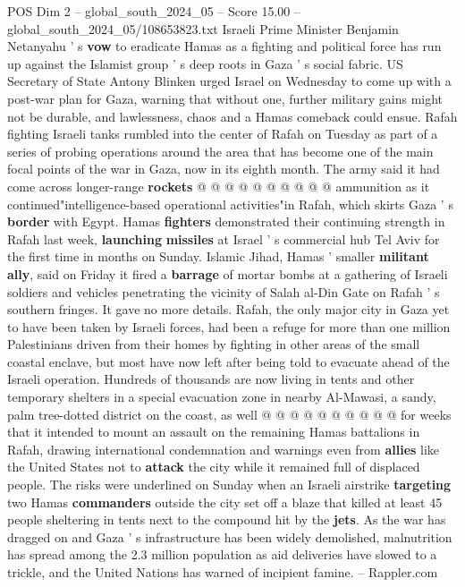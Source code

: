 \begin{textsample}{POS Dim 2 – global\_south\_2024\_05 – Score 15.00 – global\_south\_2024\_05/108653823.txt}
Israeli Prime Minister Benjamin Netanyahu ' s \textbf{vow} to eradicate Hamas as a fighting and political force has run up against the Islamist group ' s deep roots in Gaza ' s social fabric.
US Secretary of State Antony Blinken urged Israel on Wednesday to come up with a post-war plan for Gaza, warning that without one, further military gains might not be durable, and lawlessness, chaos and a Hamas comeback could ensue.
Rafah fighting Israeli tanks rumbled into the center of Rafah on Tuesday as part of a series of probing operations around the area that has become one of the main focal points of the war in Gaza, now in its eighth month.
The army said it had come across longer-range \textbf{rockets} @ @ @ @ @ @ @ @ @ @ ammunition as it continued"intelligence-based operational activities"in Rafah, which skirts Gaza ' s \textbf{border} with Egypt.
Hamas \textbf{fighters} demonstrated their continuing strength in Rafah last week, \textbf{launching} \textbf{missiles} at Israel ' s commercial hub Tel Aviv for the first time in months on Sunday.
Islamic Jihad, Hamas ' smaller \textbf{militant} \textbf{ally}, said on Friday it fired a \textbf{barrage} of mortar bombs at a gathering of Israeli soldiers and vehicles penetrating the vicinity of Salah al-Din Gate on Rafah ' s southern fringes.
It gave no more details.
Rafah, the only major city in Gaza yet to have been taken by Israeli forces, had been a refuge for more than one million Palestinians driven from their homes by fighting in other areas of the small coastal enclave, but most have now left after being told to evacuate ahead of the Israeli operation.
Hundreds of thousands are now living in tents and other temporary shelters in a special evacuation zone in nearby Al-Mawasi, a sandy, palm tree-dotted district on the coast, as well @ @ @ @ @ @ @ @ @ @ for weeks that it intended to mount an assault on the remaining Hamas battalions in Rafah, drawing international condemnation and warnings even from \textbf{allies} like the United States not to \textbf{attack} the city while it remained full of displaced people.
The risks were underlined on Sunday when an Israeli airstrike \textbf{targeting} two Hamas \textbf{commanders} outside the city set off a blaze that killed at least 45 people sheltering in tents next to the compound hit by the \textbf{jets}.
As the war has dragged on and Gaza ' s infrastructure has been widely demolished, malnutrition has spread among the 2.3 million population as aid deliveries have slowed to a trickle, and the United Nations has warned of incipient famine. -- Rappler.com

\end{textsample}

